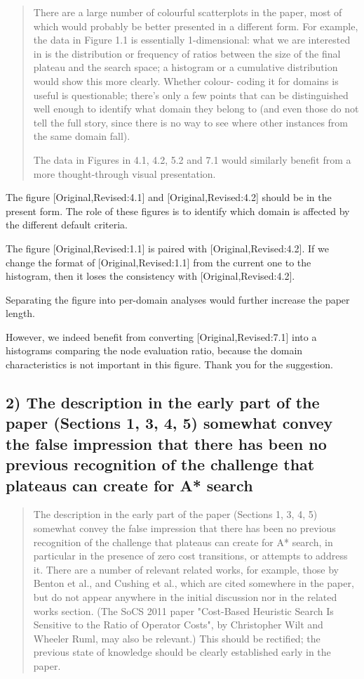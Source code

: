 \documentclass{article}
\begin{document}
\begin{quote}
 There are a large number of colourful scatterplots in the paper, most
of which would probably be better presented in a different form. For
example, the data in Figure 1.1 is essentially 1-dimensional: what we
are interested in is the distribution or frequency of ratios between
the size of the final plateau and the search space; a histogram or a
cumulative distribution would show this more clearly. Whether colour-
coding it for domains is useful is questionable; there's only a few
points that can be distinguished well enough to identify what domain
they belong to (and even those do not tell the full story, since there
is no way to see where other instances from the same domain fall).

The data in Figures in 4.1, 4.2, 5.2 and 7.1 would similarly benefit
from a more thought-through visual presentation.
\end{quote}

The figure [Original,Revised:4.1] and [Original,Revised:4.2] should be in the present form.
The role of these figures is to identify which domain is affected by the different default criteria.

The figure [Original,Revised:1.1] is paired with [Original,Revised:4.2].
If we change the format of [Original,Revised:1.1] from the current one to the histogram,
then it loses the consistency with [Original,Revised:4.2].

Separating the figure into per-domain analyses would further increase the paper length.

However, we indeed benefit from converting [Original,Revised:7.1] into a histograms
comparing the node evaluation ratio, because the domain characteristics is not important
in this figure. Thank you for the suggestion.

\subsection{2) The description in the early part of the paper (Sections 1, 3, 4, 5) somewhat convey the false impression that there has been no previous recognition of the challenge that plateaus can create for A* search}
\label{sec:orgheadline26}

\begin{quote}
 The description in the early part of the paper (Sections 1, 3, 4, 5)
somewhat convey the false impression that there has been no previous
recognition of the challenge that plateaus can create for A* search,
in particular in the presence of zero cost transitions, or attempts to
address it. There are a number of relevant related works, for example,
those by Benton et al., and Cushing et al., which are cited somewhere
in the paper, but do not appear anywhere in the initial discussion nor
in the related works section. (The SoCS 2011 paper "Cost-Based
Heuristic Search Is Sensitive to the Ratio of Operator Costs", by
Christopher Wilt and Wheeler Ruml, may also be relevant.) This should
be rectified; the previous state of knowledge should be clearly
established early in the paper.
\end{quote}
\end{document}
